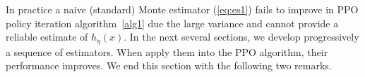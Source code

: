 \documentclass[11pt]{article}
\newcommand{\R}{\mathbb{R}}
\newcommand{\E}{\mathbb{E}}
\newcommand{\X}{\mathcal{X}}
\newcommand{\A}{\mathcal{A}}
\newtheorem{remark}{Remark}
\theoremstyle{definition}
\numberwithin{equation}{section}
\begin{document}
%






%
%




In practice a naive (standard) Monte estimator  (\ref{eq:es1}) fails to improve in PPO policy iteration
  algorithm~\ref{alg1} due the large variance and cannot provide a reliable estimate of
  $h_\eta(x)$. In the next several sections, we develop
  progressively a sequence of estimators. When apply them into the PPO
  algorithm, their performance improves. We end this section with the following two remarks.
\end{document}
